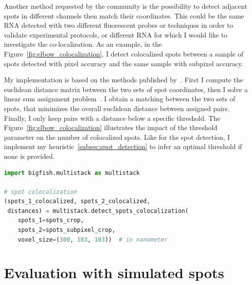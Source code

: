 Another method requested by the community is the possibility to detect adjacent spots in different channels then match their coordinates.
This could be the same \ac{RNA} detected with two different fluorescent probes or techniques in order to validate experimental protocols, or different \ac{RNA} for which I would like to investigate the co-localization.
As an example, in the Figure~\ref{fig:elbow_colocalization}, I detect colocalized spots between a sample of spots detected with pixel accuracy and the same sample with subpixel accuracy.

My implementation is based on the methods published by~\cite{CORNES_2022}.
First I compute the euclidean distance matrix between the two sets of spot coordinates, then I solve a linear sum assignment problem~\cite{crouse_linear_assignment_2016, 2020SciPy-NMeth}.
I obtain a matching between the two sets of spots, that minimizes the overall euclidean distance between assigned pairs.
Finally, I only keep pairs with a distance below a specific threshold.
The Figure~\ref{fig:elbow_colocalization} illustrates the impact of the threshold parameter on the number of colocalized spots.
Like for the spot detection, I implement my heuristic~\ref{subsec:spot_detection} to infer an optimal threshold if none is provided.\\

\begin{minipage}{0.9\textwidth}
\begin{lstlisting}[language=Python]
import bigfish.multistack as multistack

# spot colocalization
(spots_1_colocalized, spots_2_colocalized,
 distances) = multistack.detect_spots_colocalization(
	spots_1=spots_crop,
	spots_2=spots_subpixel_crop,
	voxel_size=(300, 103, 103))  # in nanometer
\end{lstlisting}
\end{minipage}


\section{Evaluation with simulated spots}
\label{sec:detection_evaluation}

